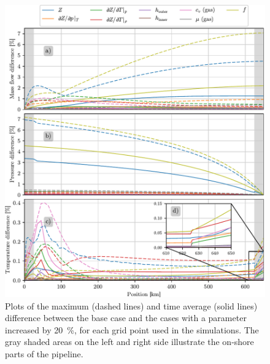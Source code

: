\begin{figure}[!p]%
    \centering%
    \includegraphics{figures/difference_along_pipeline_shaded_abc_inset.pdf}%
    \caption{%
        Plots of the maximum (dashed lines) and time average (solid lines) difference between the base case and the cases with a parameter increased by \SI{20}{\percent}, for each grid point used in the simulations. The gray shaded areas on the left and right side illustrate the on-shore parts of the pipeline.
        \label{fig:maxAndAverageForAll}%
    }%
\end{figure}%

